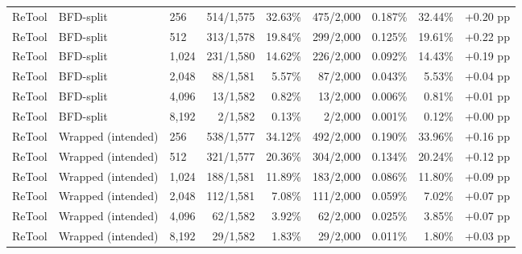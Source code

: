 \begin{longtable}{lllrrrrrr}
ReTool & BFD-split & 256 & 514/1,575 & 32.63\% & 475/2,000 & 0.187\% & 32.44\% & +0.20 pp \\
ReTool & BFD-split & 512 & 313/1,578 & 19.84\% & 299/2,000 & 0.125\% & 19.61\% & +0.22 pp \\
ReTool & BFD-split & 1,024 & 231/1,580 & 14.62\% & 226/2,000 & 0.092\% & 14.43\% & +0.19 pp \\
ReTool & BFD-split & 2,048 & 88/1,581 & 5.57\% & 87/2,000 & 0.043\% & 5.53\% & +0.04 pp \\
ReTool & BFD-split & 4,096 & 13/1,582 & 0.82\% & 13/2,000 & 0.006\% & 0.81\% & +0.01 pp \\
ReTool & BFD-split & 8,192 & 2/1,582 & 0.13\% & 2/2,000 & 0.001\% & 0.12\% & +0.00 pp \\
ReTool & Wrapped (intended) & 256 & 538/1,577 & 34.12\% & 492/2,000 & 0.190\% & 33.96\% & +0.16 pp \\
ReTool & Wrapped (intended) & 512 & 321/1,577 & 20.36\% & 304/2,000 & 0.134\% & 20.24\% & +0.12 pp \\
ReTool & Wrapped (intended) & 1,024 & 188/1,581 & 11.89\% & 183/2,000 & 0.086\% & 11.80\% & +0.09 pp \\
ReTool & Wrapped (intended) & 2,048 & 112/1,581 & 7.08\% & 111/2,000 & 0.059\% & 7.02\% & +0.07 pp \\
ReTool & Wrapped (intended) & 4,096 & 62/1,582 & 3.92\% & 62/2,000 & 0.025\% & 3.85\% & +0.07 pp \\
ReTool & Wrapped (intended) & 8,192 & 29/1,582 & 1.83\% & 29/2,000 & 0.011\% & 1.80\% & +0.03 pp \\


\end{longtable}
